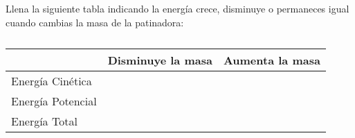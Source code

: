 \question[5] Llena la siguiente tabla indicando la energía crece, disminuye o permaneces igual cuando cambias la masa de la patinadora:
\renewcommand{\arraystretch}{1.6}

\begin{table}[H]
    \centering
    \begin{tabular}{|l|c|c|}
        \hline
                          & Disminuye la masa & Aumenta la masa \\ \hline
        Energía Cinética  &                   &                 \\ \hline
        Energía Potencial &                   &                 \\ \hline
        Energía Total     &                   &                 \\ \hline
    \end{tabular}
    \caption{}
    \label{tab:masa}
\end{table}